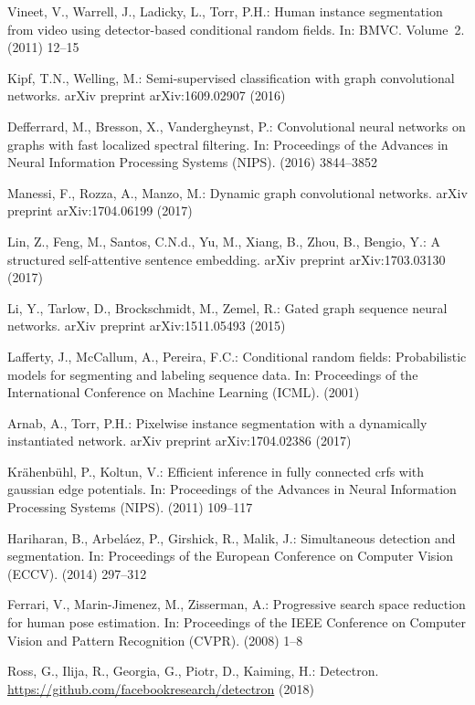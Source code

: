\documentclass[10pt, letterpaper]{article}
\begin{document}
\begin{thebibliography}{10}
Vineet, V., Warrell, J., Ladicky, L., Torr, P.H.:
\newblock Human instance segmentation from video using detector-based
  conditional random fields.
\newblock In: BMVC. Volume~2. (2011)  12--15

Kipf, T.N., Welling, M.:
\newblock Semi-supervised classification with graph convolutional networks.
\newblock arXiv preprint arXiv:1609.02907 (2016)

Defferrard, M., Bresson, X., Vandergheynst, P.:
\newblock Convolutional neural networks on graphs with fast localized spectral
  filtering.
\newblock In: Proceedings of the Advances in Neural Information Processing
  Systems (NIPS). (2016)  3844--3852

Manessi, F., Rozza, A., Manzo, M.:
\newblock Dynamic graph convolutional networks.
\newblock arXiv preprint arXiv:1704.06199 (2017)

Lin, Z., Feng, M., Santos, C.N.d., Yu, M., Xiang, B., Zhou, B., Bengio, Y.:
\newblock A structured self-attentive sentence embedding.
\newblock arXiv preprint arXiv:1703.03130 (2017)

Li, Y., Tarlow, D., Brockschmidt, M., Zemel, R.:
\newblock Gated graph sequence neural networks.
\newblock arXiv preprint arXiv:1511.05493 (2015)

Lafferty, J., McCallum, A., Pereira, F.C.:
\newblock Conditional random fields: Probabilistic models for segmenting and
  labeling sequence data.
\newblock In: Proceedings of the International Conference on Machine Learning
  (ICML). (2001)

Arnab, A., Torr, P.H.:
\newblock Pixelwise instance segmentation with a dynamically instantiated
  network.
\newblock arXiv preprint arXiv:1704.02386 (2017)

Kr{\"a}henb{\"u}hl, P., Koltun, V.:
\newblock Efficient inference in fully connected crfs with gaussian edge
  potentials.
\newblock In: Proceedings of the Advances in Neural Information Processing
  Systems (NIPS). (2011)  109--117

Hariharan, B., Arbel{\'a}ez, P., Girshick, R., Malik, J.:
\newblock Simultaneous detection and segmentation.
\newblock In: Proceedings of the European Conference on Computer Vision (ECCV).
  (2014)  297--312

Ferrari, V., Marin-Jimenez, M., Zisserman, A.:
\newblock Progressive search space reduction for human pose estimation.
\newblock In: Proceedings of the IEEE Conference on Computer Vision and Pattern
  Recognition (CVPR). (2008)  1--8

Ross, G., Ilija, R., Georgia, G., Piotr, D., Kaiming, H.:
\newblock Detectron.
\newblock \url{https://github.com/facebookresearch/detectron} (2018)

\end{thebibliography}
\end{document}
